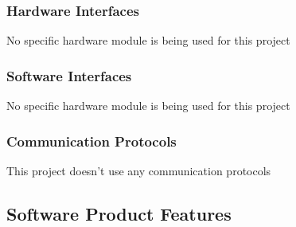 \documentclass[a4paper,11pt]{article}
\begin{document}
			\subsubsection{Hardware Interfaces}
			No specific hardware module is being used for this project
			\subsubsection{Software Interfaces}
			No specific hardware module is being used for this project 
			\subsubsection{Communication Protocols}
			This project doesn’t use any communication protocols
		\subsection{Software Product Features}
\end{document}
